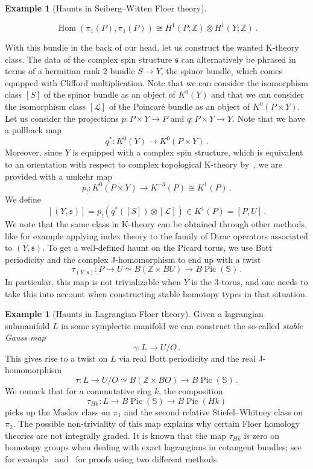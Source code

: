 \documentclass[10pt]{amsart}
\newcommand{\longto}{\longrightarrow}
\theoremstyle{plain}
\theoremstyle{definition}
\newtheorem{example}[theorem]{Example}
\DeclareMathOperator{\Pic}{Pic}
\DeclareMathOperator{\Hom}{Hom}
\newcommand{\bS}{\mathbb{S}}
\newcommand{\bZ}{\mathbb{Z}}
\begin{document}
\begin{example}[Haunts in Seiberg--Witten Floer theory]
\begin{itemize}
  \[
  \Hom(\pi_1(P),\pi_1(P)) \cong H^1(P;\bZ) \otimes H^1(Y;\bZ) \,.
  \]
\end{itemize}
With this bundle in the back of our head, let us construct the wanted K-theory class.
The data of the complex spin structure $\mathfrak{s}$ can alternatively be phrased in terms of a hermitian rank $2$ bundle $S \to Y$, the spinor bundle, which comes equipped with Clifford multiplication.
Note that we can consider the isomorphism class $[S]$ of the spinor bundle as an object of $K^0(Y)$ and that we can consider the isomorphism class $[\mathcal{L}]$ of the Poincaré bundle as an object of $K^0(P \times Y)$.
Let us consider the projections $p : P \times Y \longto P$ and $q : P \times Y \longto Y$. Note that we have a pullback map
\[
q^* : K^0(Y) \longto K^0(P \times Y) \,.
\]
Moreover, since $Y$ is equipped with a complex spin structure, which is equivalent to an orientation with respect to complex topological K-theory by~\cite{ABS64}, we are provided with a umkehr map
\[
p_! : K^0(P \times Y) \longto K^{-3}(P) \cong K^1(P) \,.
\]
We define
\[
[(Y,\mathfrak{s})] = p_!(q^*([S]) \otimes [\mathcal{L}]) \in K^1(P) = [P,U] \,.
\]
We note that the same class in K-theory can be obtained through other methods, like for example applying index theory to the family of Dirac operators associated to $(Y,\mathfrak{s})$.
To get a well-defined haunt on the Picard torus, we use Bott periodicity and the complex J-homomorphism to end up with a twist
\[
\tau_{(Y,\mathfrak{s})} : P \longto U \simeq B(\bZ \times BU) \longto B\Pic(\bS) \,.
\]
In particular, this map is not trivializable when $Y$ is the 3-torus, and one needs to take this into account when constructing stable homotopy types in that situation.
\end{example}

\begin{example}[Haunts in Lagrangian Floer theory]
  Given a lagrangian submanifold $L$ in some symplectic manifold we can construct the so-called \emph{stable Gauss map}
  \[
  \gamma : L \longto U/O \,.
  \]
  This gives rise to a twist on $L$ via real Bott periodicity and the real J-homomorphism
  \[
  \tau : L \longto U/O \simeq B(\bZ \times BO) \longto B\Pic(\bS)\,.
  \]
  We remark that for a commutative ring $k$, the composition
  \[
    \tau_{Hk} : L \longto B\Pic(\bS) \longto B\Pic(Hk)
  \]
  picks up the Maslov class on $\pi_1$ and the second relative Stiefel--Whitney class on $\pi_2$.
  The possible non-triviality of this map explains why certain Floer homology theories are not integrally graded.
  It is known that the map $\tau_{Hk}$ is zero on homotopy groups when dealing with exact lagrangians in cotangent bundles; see for example~\cite{AK16} and~\cite{Jin20} for proofs using two different methods.
\end{example}
\end{document}
